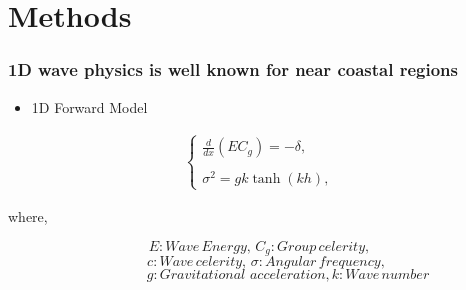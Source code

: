 \documentclass[7pt]{beamer}
\begin{document}
\section{Methods}
\begin{frame}
 \frametitle{1D wave physics is well known for near coastal regions}
\centering
\begin{itemize}
\item 1D Forward Model
\end{itemize}

\begin{eqnarray*}
\label{fp1}
\left \{
\begin{array}{lll}
\frac{d}{dx}\left(EC_g\right)=-\delta,\\
\\
\sigma^2=gk\tanh(kh),
\label{ode}
\end{array}
\right.
\end{eqnarray*}
\begin{flushleft}
where,
\end{flushleft}
$${E: Wave \,Energy,\, C_{g}: Group \,celerity,}$$
$${\quad c: Wave \,celerity,\, \sigma: Angular \,frequency,}$$
$${\quad\quad\quad\quad g: Gravitational\,\, acceleration,k: Wave \,number}$$
\end{frame}
\end{document}
